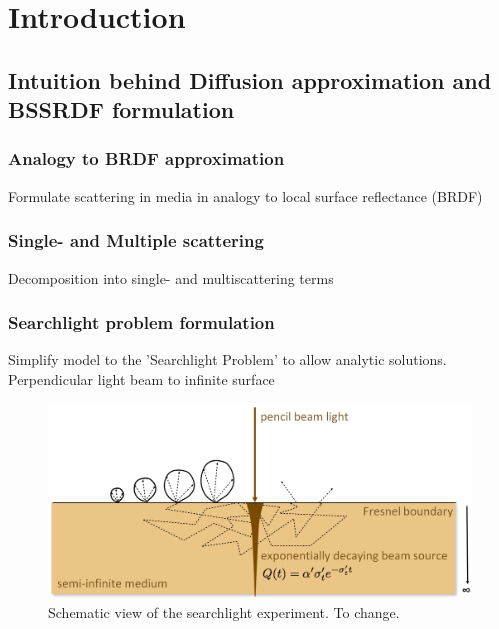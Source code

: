 \chapter{Introduction}
\label{chapter:introduction}







\section{Intuition behind Diffusion approximation and BSSRDF formulation}

\subsection{Analogy to BRDF approximation}
\label{section:BSSRDF_intuition}
Formulate scattering in media in analogy to local surface reflectance (BRDF)

\subsection{Single- and Multiple scattering}
Decomposition into single- and multiscattering terms

\subsection{Searchlight problem formulation}
\label{section:searchlight}
Simplify model to the 'Searchlight Problem' to allow analytic solutions.
Perpendicular light beam to infinite surface \cite{Jacques1995}
\begin{figure}[h]
    \centering
    \includegraphics[width=\textwidth]{imgs/schemes/searchlight_disney}
    \caption{Schematic view of the searchlight experiment. To change.}
    \label{fig:searchlight_scheme}
\end{figure}

